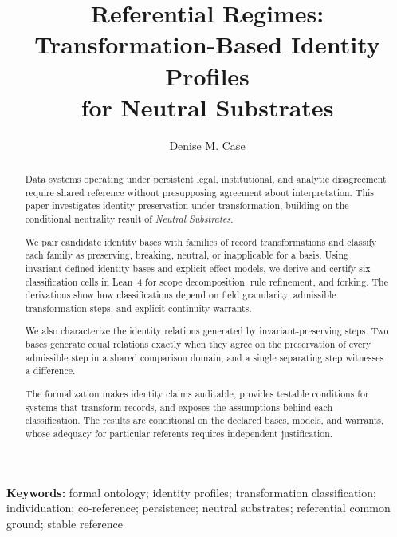 \documentclass[11pt]{article}
\title{Referential Regimes:  \\
Transformation-Based Identity Profiles \\
for Neutral Substrates}
\author{Denise M. Case}
\affil{Northwest Missouri State University, Computer Science and Information Systems, Maryville, MO, USA}
\date{} %
\theoremstyle{plain}
\theoremstyle{definition}
\theoremstyle{remark}
\providecommand{\keywords}[1]{\textbf{Keywords: } #1}
\begin{document}
\maketitle
\vspace{-1em}

\begin{abstract}
Data systems operating under persistent legal, institutional,
and analytic disagreement require shared reference without
presupposing agreement about interpretation.
This paper investigates identity preservation under
transformation, building on the conditional neutrality
result of \emph{Neutral Substrates}.

We pair candidate identity bases with families of record
transformations and classify each family as preserving, breaking,
neutral, or inapplicable for a basis.
Using invariant-defined identity bases and explicit effect
models, we derive and certify six classification cells in Lean~4
for scope decomposition, rule refinement, and forking.
The derivations show how classifications depend on field
granularity, admissible transformation steps, and explicit
continuity warrants.

We also characterize the identity relations generated
by invariant-preserving steps.
Two bases generate equal relations exactly when they agree on
the preservation of every admissible step in a shared comparison
domain, and a single separating step witnesses a difference.

The formalization makes identity claims auditable, provides
testable conditions for systems that transform records, and
exposes the assumptions behind each classification.
The results are conditional on the declared bases, models, and
warrants, whose adequacy for particular referents requires
independent justification.
\end{abstract}

\keywords{
  formal ontology;
  identity profiles;
  transformation classification;
  individuation;
  co-reference;
  persistence;
  neutral substrates;
  referential common ground;
  stable reference
}














\end{document}
